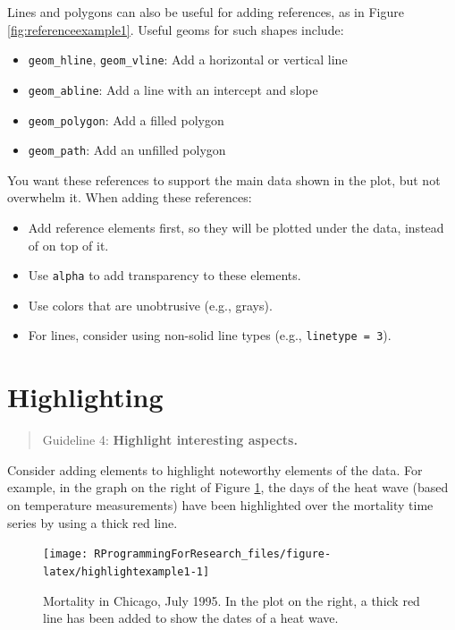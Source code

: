 \documentclass[]{book}
\providecommand{\tightlist}{%
  \setlength{\itemsep}{0pt}\setlength{\parskip}{0pt}}
\theoremstyle{definition}
\theoremstyle{definition}
\theoremstyle{definition}
\theoremstyle{remark}
\begin{document}
Lines and polygons can also be useful for adding references, as in
Figure \ref{fig:referenceexample1}. Useful geoms for such shapes
include:

\begin{itemize}
\tightlist
\item
  \texttt{geom\_hline}, \texttt{geom\_vline}: Add a horizontal or
  vertical line
\item
  \texttt{geom\_abline}: Add a line with an intercept and slope
\item
  \texttt{geom\_polygon}: Add a filled polygon
\item
  \texttt{geom\_path}: Add an unfilled polygon
\end{itemize}

You want these references to support the main data shown in the plot,
but not overwhelm it. When adding these references:

\begin{itemize}
\tightlist
\item
  Add reference elements first, so they will be plotted under the data,
  instead of on top of it.
\item
  Use \texttt{alpha} to add transparency to these elements.
\item
  Use colors that are unobtrusive (e.g., grays).
\item
  For lines, consider using non-solid line types (e.g.,
  \texttt{linetype\ =\ 3}).
\end{itemize}

\section{Highlighting}\label{highlighting}

\begin{quote}
Guideline 4: \textbf{Highlight interesting aspects.}
\end{quote}

Consider adding elements to highlight noteworthy elements of the data.
For example, in the graph on the right of Figure
\ref{fig:highlightexample1}, the days of the heat wave (based on
temperature measurements) have been highlighted over the mortality time
series by using a thick red line.

\begin{figure}

{\centering \texttt{[image: RProgrammingForResearch\_files/figure-latex/highlightexample1-1]} 

}

\caption{Mortality in Chicago, July 1995. In the plot on the right, a thick red line has been added to show the dates of a heat wave.}\label{fig:highlightexample1}
\end{figure}
\end{document}
